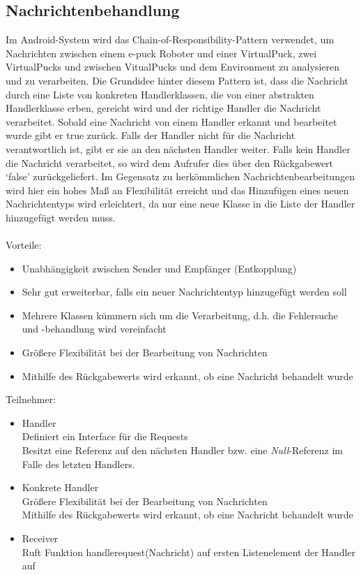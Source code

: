 \documentclass[10pt,a4paper]{article}
\begin{document}
  		\subsection{Nachrichtenbehandlung}
  			Im Android-System wird das Chain-of-Responsibility-Pattern verwendet, um Nachrichten zwischen einem e-puck Roboter und einer
  			VirtualPuck, zwei VirtualPucks und zwischen VitualPucks und dem Environment zu analysieren und zu verarbeiten. Die Grundidee hinter
  			diesem Pattern ist, dass die Nachricht durch eine Liste
  			von konkreten Handlerklassen, die von einer abstrakten Handlerklasse erben, gereicht wird und der richtige Handler die Nachricht
  			verarbeitet. Sobald eine Nachricht von einem Handler erkannt und bearbeitet wurde gibt er true zurück. Falls der Handler nicht
  			für die Nachricht verantwortlich ist, gibt er sie an den nächsten Handler weiter. Falls kein Handler die Nachricht verarbeitet, so wird
  			dem Aufrufer dies über den Rückgabewert `false' zurückgeliefert. Im Gegensatz zu herkömmlichen Nachrichtenbearbeitungen wird hier ein
  			hohes Maß an Flexibilität erreicht und das Hinzufügen eines neuen Nachrichtentyps wird erleichtert, da nur eine neue Klasse in die
  			Liste der Handler hinzugefügt werden muss. \\ \\
  			Vorteile:
  			\begin{itemize}
  				\item Unabhängigkeit zwischen Sender und Empfänger (Entkopplung)
  				\item Sehr gut erweiterbar, falls ein neuer Nachrichtentyp hinzugefügt werden soll
  				\item Mehrere Klassen kümmern sich um die Verarbeitung, d.h. die Fehlersuche und -behandlung wird vereinfacht
  				\item Größere Flexibilität bei der Bearbeitung von Nachrichten
  				\item Mithilfe des Rückgabewerts wird erkannt, ob eine Nachricht behandelt wurde
  			\end{itemize}  
  			Teilnehmer:
   			\begin{itemize}
  				\item Handler\\Definiert ein Interface für die Requests\\Besitzt eine Referenz auf den nächsten Handler bzw. eine \textit{Null}-Referenz
  					im Falle des letzten Handlers.
  				\item Konkrete Handler\\Größere Flexibilität bei der Bearbeitung von Nachrichten\\
  					Mithilfe des Rückgabewerts wird erkannt, ob eine Nachricht behandelt wurde
  				\item Receiver \\ Ruft Funktion handlerequest(Nachricht) auf ersten Listenelement der Handler auf
  			\end{itemize}   	
\end{document}
